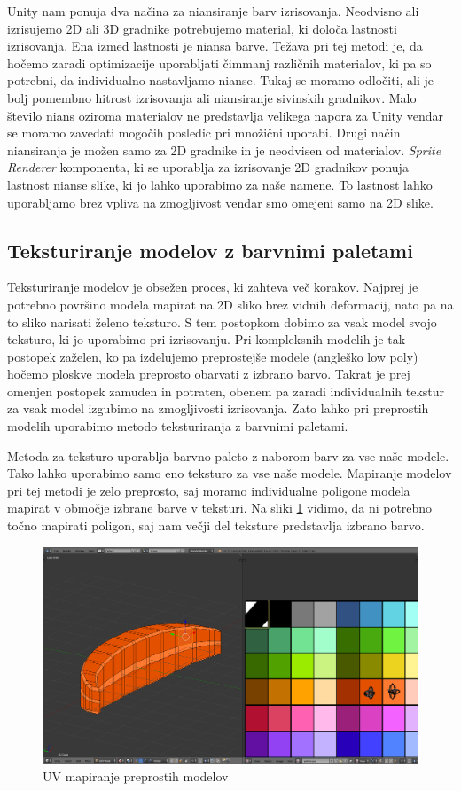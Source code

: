 \documentclass[12pt,a4paper,twoside]{book}
\begin{document}
Unity nam ponuja dva načina za niansiranje barv izrisovanja. Neodvisno ali izrisujemo 2D ali 3D gradnike potrebujemo material, ki določa lastnosti izrisovanja. Ena izmed lastnosti je niansa barve. Težava pri tej metodi je, da hočemo zaradi optimizacije uporabljati čimmanj različnih materialov, ki pa so potrebni, da individualno nastavljamo nianse. Tukaj se moramo odločiti, ali je bolj pomembno hitrost izrisovanja ali niansiranje sivinskih gradnikov. Malo število nians oziroma materialov ne predstavlja velikega napora za Unity vendar se moramo zavedati mogočih posledic pri množični uporabi. Drugi način niansiranja je možen samo za 2D gradnike in je neodvisen od materialov. \textit{Sprite Renderer} komponenta, ki se uporablja za izrisovanje 2D gradnikov ponuja lastnost nianse slike, ki jo lahko uporabimo za naše namene. To lastnost lahko uporabljamo brez vpliva na zmogljivost vendar smo omejeni samo na 2D slike.

\subsection{Teksturiranje modelov z barvnimi paletami}
Teksturiranje modelov je obsežen proces, ki zahteva več korakov. Najprej je potrebno površino modela mapirat na 2D sliko brez vidnih deformacij, nato pa na to sliko narisati želeno teksturo. S tem postopkom dobimo za vsak model svojo teksturo, ki jo uporabimo pri izrisovanju. Pri kompleksnih modelih je tak postopek zaželen, ko pa izdelujemo preprostejše modele (angleško low poly) hočemo ploskve modela preprosto obarvati z izbrano barvo. Takrat je prej omenjen postopek zamuden in potraten, obenem pa zaradi individualnih tekstur za vsak model izgubimo na zmogljivosti izrisovanja. Zato lahko pri preprostih modelih uporabimo metodo teksturiranja z barvnimi paletami.

Metoda za teksturo uporablja barvno paleto z naborom barv za vse naše modele. Tako lahko uporabimo samo eno teksturo za vse naše modele. Mapiranje modelov pri tej metodi je zelo preprosto, saj moramo individualne poligone modela mapirat v območje izbrane barve v teksturi. Na sliki \ref{slika:texturePalette} vidimo, da ni potrebno točno mapirati poligon, saj nam večji del teksture predstavlja izbrano barvo. 

\begin{figure}[h]
	\centering
	\includegraphics[width=14cm]{texturePalette}
	\caption{UV mapiranje preprostih modelov}
	\label{slika:texturePalette}
\end{figure}
\end{document}
